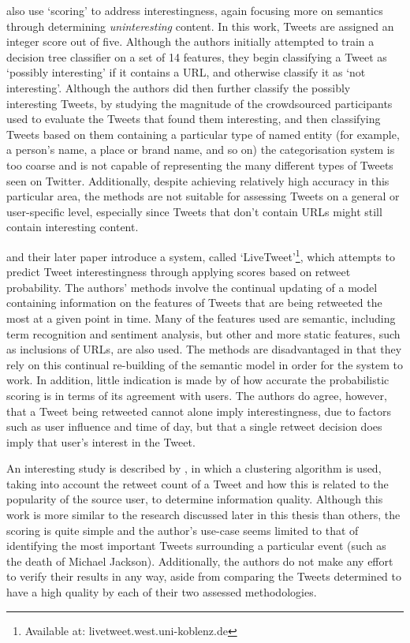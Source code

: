 \citet{alonso10} also use `scoring' to address interestingness, again focusing more on semantics through determining \textit{uninteresting} content. In this work, Tweets are assigned an integer score out of five. Although the authors initially attempted to train a decision tree classifier on a set of 14 features, they begin classifying a Tweet as `possibly interesting' if it contains a URL, and otherwise classify it as `not interesting'. Although the authors did then further classify the possibly interesting Tweets, by studying the magnitude of the crowdsourced participants used to evaluate the Tweets that found them interesting, and then classifying Tweets based on them containing a particular type of named entity (for example, a person's name, a place or brand name, and so on) the categorisation system is too coarse and is not capable of representing the many different types of Tweets seen on Twitter. Additionally, despite achieving relatively high accuracy in this particular area, the methods are not suitable for assessing Tweets on a general or user-specific level, especially since Tweets that don't contain URLs might still contain interesting content.

\citet{aldahi11} and their later paper \cite{aldahi12} introduce a system, called `LiveTweet'\footnote{Available at: livetweet.west.uni-koblenz.de}, which attempts to predict Tweet interestingness through applying scores based on retweet probability. The authors' methods involve the continual updating of a model containing information on the features of Tweets that are being retweeted the most at a given point in time. Many of the features used are semantic, including term recognition and sentiment analysis, but other and more static features, such as inclusions of URLs, are also used. The methods are disadvantaged in that they rely on this continual re-building of the semantic model in order for the system to work. In addition, little indication is made by \citet{aldahi12} of how accurate the probabilistic scoring is in terms of its agreement with users. The authors do agree, however, that a Tweet being retweeted cannot alone imply interestingness, due to factors such as user influence and time of day, but that a single retweet decision does imply that user's interest in the Tweet.

An interesting study is described by \citet{lauw10}, in which a clustering algorithm is used, taking into account the retweet count of a Tweet and how this is related to the popularity of the source user, to determine information quality. Although this work is more similar to the research discussed later in this thesis than others, the scoring is quite simple and the author's use-case seems limited to that of identifying the most important Tweets surrounding a particular event (such as the death of Michael Jackson). Additionally, the authors do not make any effort to verify their results in any way, aside from comparing the Tweets determined to have a high quality by each of their two assessed methodologies.



